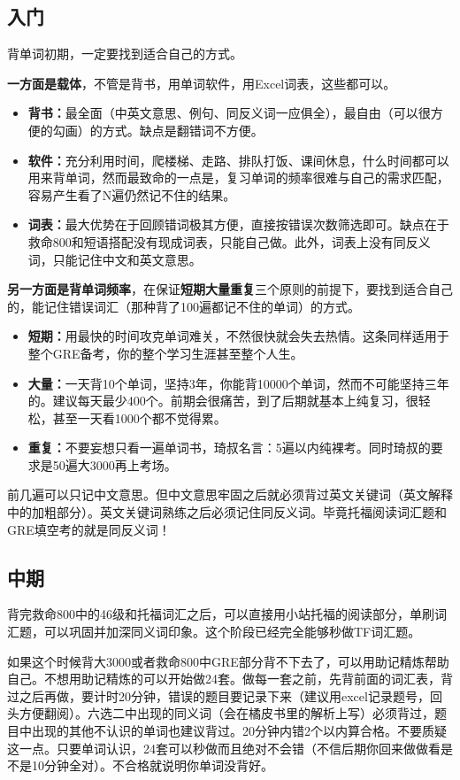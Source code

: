 \documentclass[cn,plain]{elegantbookex}
\begin{document}
\subsection{入门}
背单词初期，一定要找到适合自己的方式。

\textbf{一方面是载体}，不管是背书，用单词软件，用Excel词表，这些都可以。

\begin{itemize}
    \item \textbf{背书：}最全面（中英文意思、例句、同反义词一应俱全），最自由（可以很方便的勾画）的方式。缺点是翻错词不方便。
    \item \textbf{软件：}充分利用时间，爬楼梯、走路、排队打饭、课间休息，什么时间都可以用来背单词，然而最致命的一点是，复习单词的频率很难与自己的需求匹配，容易产生看了N遍仍然记不住的结果。
    \item \textbf{词表：}最大优势在于回顾错词极其方便，直接按错误次数筛选即可。缺点在于救命800和短语搭配没有现成词表，只能自己做。此外，词表上没有同反义词，只能记住中文和英文意思。
\end{itemize}

\textbf{另一方面是背单词频率}，在保证\textbf{短期大量重复}三个原则的前提下，要找到适合自己的，能记住错误词汇（那种背了100遍都记不住的单词）的方式。

\begin{itemize}
    \item \textbf{短期：}用最快的时间攻克单词难关，不然很快就会失去热情。这条同样适用于整个GRE备考，你的整个学习生涯甚至整个人生。
    \item \textbf{大量：}一天背10个单词，坚持3年，你能背10000个单词，然而不可能坚持三年的。建议每天最少400个。前期会很痛苦，到了后期就基本上纯复习，很轻松，甚至一天看1000个都不觉得累。
    \item \textbf{重复：}不要妄想只看一遍单词书，琦叔名言：5遍以内纯裸考。同时琦叔的要求是50遍大3000再上考场。
\end{itemize}

前几遍可以只记中文意思。但中文意思牢固之后就必须背过英文关键词（英文解释中的加粗部分）。英文关键词熟练之后必须记住同反义词。毕竟托福阅读词汇题和GRE填空考的就是同反义词！

\subsection{中期}背完救命800中的46级和托福词汇之后，可以直接用小站托福的阅读部分，单刷词汇题，可以巩固并加深同义词印象。这个阶段已经完全能够秒做TF词汇题。

如果这个时候背大3000或者救命800中GRE部分背不下去了，可以用助记精炼帮助自己。不想用助记精炼的可以开始做24套。做每一套之前，先背前面的词汇表，背过之后再做，要计时20分钟，错误的题目要记录下来（建议用excel记录题号，回头方便翻阅）。六选二中出现的同义词（会在橘皮书里的解析上写）必须背过，题目中出现的其他不认识的单词也建议背过。20分钟内错2个以内算合格。不要质疑这一点。只要单词认识，24套可以秒做而且绝对不会错（不信后期你回来做做看是不是10分钟全对）。不合格就说明你单词没背好。
\end{document}
